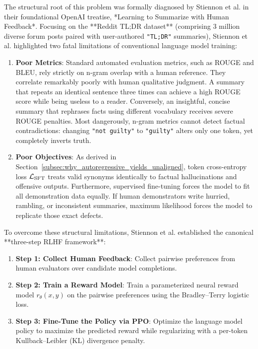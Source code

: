 \documentclass[../../main.tex]{subfiles}
\begin{document}
The structural root of this problem was formally diagnosed by Stiennon et al. \citep{stiennon2020} in their foundational OpenAI treatise, *Learning to Summarize with Human Feedback*. Focusing on the **Reddit TL;DR dataset** (comprising 3 million diverse forum posts paired with user-authored \texttt{"TL;DR"} summaries), Stiennon et al. highlighted two fatal limitations of conventional language model training:
\begin{enumerate}
    \item \textbf{Poor Metrics}: Standard automated evaluation metrics, such as ROUGE and BLEU, rely strictly on n-gram overlap with a human reference. They correlate remarkably poorly with human qualitative judgment. A summary that repeats an identical sentence three times can achieve a high ROUGE score while being useless to a reader. Conversely, an insightful, concise summary that rephrases facts using different vocabulary receives severe ROUGE penalties. Most dangerously, n-gram metrics cannot detect factual contradictions: changing \texttt{"not guilty"} to \texttt{"guilty"} alters only one token, yet completely inverts truth.
    \item \textbf{Poor Objectives}: As derived in Section~\ref{subsec:why_autoregressive_yields_unaligned}, token cross-entropy loss $\mathcal{L}_{\text{SFT}}$ treats valid synonyms identically to factual hallucinations and offensive outputs. Furthermore, supervised fine-tuning forces the model to fit all demonstration data equally. If human demonstrators write hurried, rambling, or inconsistent summaries, maximum likelihood forces the model to replicate those exact defects.
\end{enumerate}

To overcome these structural limitations, Stiennon et al. established the canonical **three-step RLHF framework**:
\begin{enumerate}
    \item \textbf{Step 1: Collect Human Feedback}: Collect pairwise preferences from human evaluators over candidate model completions.
    \item \textbf{Step 2: Train a Reward Model}: Train a parameterized neural reward model $r_\theta(x, y)$ on the pairwise preferences using the Bradley--Terry logistic loss.
    \item \textbf{Step 3: Fine-Tune the Policy via PPO}: Optimize the language model policy to maximize the predicted reward while regularizing with a per-token Kullback--Leibler (KL) divergence penalty.
\end{enumerate}
\end{document}
